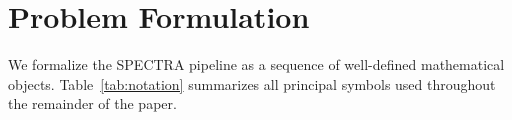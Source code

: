 \documentclass[journal]{IEEEtran}
\begin{document}
%
%

\section{Problem Formulation}
\label{sec:problem}

We formalize the \textsc{SPECTRA} pipeline as a sequence of well-defined
mathematical objects.  Table~\ref{tab:notation} summarizes all principal
symbols used throughout the remainder of the paper.
\end{document}
